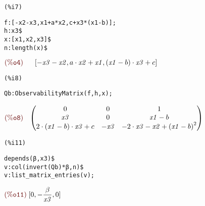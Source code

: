 \noindent
\begin{minipage}[t]{8ex}\color{red}\bf
\begin{verbatim}
(%i7) 
\end{verbatim}
\end{minipage}
\begin{minipage}[t]{\textwidth}\color{blue}
\begin{verbatim}
f:[-x2-x3,x1+a*x2,c+x3*(x1-b)];
h:x3$
x:[x1,x2,x3]$
n:length(x)$
\end{verbatim}
\end{minipage}

\noindent
\begin{math}\displaystyle
\parbox{10ex}{$\color{labelcolor}\mathrm{\tt (\%o4) }\quad $}
[-\mathit{x3}-\mathit{x2},a\cdot \mathit{x2}+\mathit{x1},\left( \mathit{x1}-b\right) \cdot \mathit{x3}+c]\mbox{}
\end{math}


\noindent
\begin{minipage}[t]{8ex}\color{red}\bf
\begin{verbatim}
(%i8) 
\end{verbatim}
\end{minipage}
\begin{minipage}[t]{\textwidth}\color{blue}
\begin{verbatim}
Qb:ObservabilityMatrix(f,h,x);
\end{verbatim}
\end{minipage}

\noindent
\begin{math}\displaystyle
\parbox{8ex}{$\color{labelcolor}\mathrm{\tt (\%o8) }\quad $}
\begin{pmatrix}0 & 0 & 1\cr \mathit{x3} & 0 & \mathit{x1}-b\cr 2\cdot \left( \mathit{x1}-b\right) \cdot \mathit{x3}+c & -\mathit{x3} & -2\cdot \mathit{x3}-\mathit{x2}+{{\left( \mathit{x1}-b\right) }^{2}}\end{pmatrix}\mbox{}
\end{math}


\noindent
\begin{minipage}[t]{8ex}\color{red}\bf
\begin{verbatim}
(%i11) 
\end{verbatim}
\end{minipage}
\begin{minipage}[t]{\textwidth}\color{blue}
\begin{verbatim}
depends(β,x3)$
v:col(invert(Qb)*β,n)$
v:list_matrix_entries(v);
\end{verbatim}
\end{minipage}

\noindent
\begin{math}\displaystyle
\parbox{8ex}{$\color{labelcolor}\mathrm{\tt (\%o11) }\quad $}
[0,-\frac{\beta}{\mathit{x3}},0]\mbox{}
\end{math}
